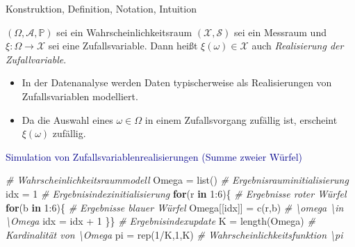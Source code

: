 \documentclass[
  8pt,
  ignorenonframetext,
]{beamer}
\newenvironment{Shaded}{\begin{snugshade}}{\end{snugshade}}
\newcommand{\CommentTok}[1]{\textcolor[rgb]{0.56,0.35,0.01}{\textit{#1}}}
\newcommand{\ControlFlowTok}[1]{\textcolor[rgb]{0.13,0.29,0.53}{\textbf{#1}}}
\newcommand{\DecValTok}[1]{\textcolor[rgb]{0.00,0.00,0.81}{#1}}
\newcommand{\FunctionTok}[1]{\textcolor[rgb]{0.00,0.00,0.00}{#1}}
\newcommand{\NormalTok}[1]{#1}
\newcommand{\OtherTok}[1]{\textcolor[rgb]{0.56,0.35,0.01}{#1}}
\newcommand{\SpecialCharTok}[1]{\textcolor[rgb]{0.00,0.00,0.00}{#1}}
\providecommand{\tightlist}{%
  \setlength{\itemsep}{0pt}\setlength{\parskip}{0pt}}
\begin{document}
\begin{frame}[fragile]{Konstruktion, Definition, Notation, Intuition}
\protect\hypertarget{konstruktion-definition-notation-intuition-6}{}
\small
\vspace{2mm}
\begin{definition}
\justifying
$(\Omega, \mathcal{A}, \mathbb{P})$ sei ein Wahrscheinlichkeitsraum
$(\mathcal{X},\mathcal{S})$ sei ein Messraum und $\xi : \Omega \to \mathcal{X}$
sei eine Zufallsvariable. Dann heißt $\xi(\omega) \in \mathcal{X}$ auch
\textit{Realisierung der Zufallvariable}.
\end{definition}
\footnotesize

\begin{itemize}
\tightlist
\item
  In der Datenanalyse werden Daten typischerweise als Realisierungen von
  Zufallsvariablen modelliert.
\item
  Da die Auswahl eines \(\omega \in \Omega\) in einem Zufallsvorgang
  zufällig ist, erscheint \(\xi(\omega)\) zufällig.
\end{itemize}

\small

\textcolor{darkblue}{Simulation von Zufallsvariablenrealisierungen (Summe zweier Würfel)}
\vspace{1mm} \footnotesize {}

\begin{Shaded}
\begin{Highlighting}[]
\CommentTok{\# Wahrscheinlichkeitsraummodell}
\NormalTok{Omega    }\OtherTok{=} \FunctionTok{list}\NormalTok{()                                 }\CommentTok{\# Ergebnisrauminitialisierung}
\NormalTok{idx      }\OtherTok{=} \DecValTok{1}                                      \CommentTok{\# Ergebnisindexinitialisierung}
\ControlFlowTok{for}\NormalTok{(r }\ControlFlowTok{in} \DecValTok{1}\SpecialCharTok{:}\DecValTok{6}\NormalTok{)\{                                    }\CommentTok{\# Ergebnisse roter  Würfel}
    \ControlFlowTok{for}\NormalTok{(b }\ControlFlowTok{in} \DecValTok{1}\SpecialCharTok{:}\DecValTok{6}\NormalTok{)\{                                }\CommentTok{\# Ergebnisse blauer Würfel}
\NormalTok{        Omega[[idx]] }\OtherTok{=} \FunctionTok{c}\NormalTok{(r,b)                     }\CommentTok{\# \textbackslash{}omega \textbackslash{}in \textbackslash{}Omega}
\NormalTok{        idx          }\OtherTok{=}\NormalTok{ idx }\SpecialCharTok{+} \DecValTok{1}\NormalTok{ \}\}                 }\CommentTok{\# Ergebnisindexupdate}
\NormalTok{K        }\OtherTok{=} \FunctionTok{length}\NormalTok{(Omega)                          }\CommentTok{\# Kardinalität von \textbackslash{}Omega}
\NormalTok{pi       }\OtherTok{=} \FunctionTok{rep}\NormalTok{(}\DecValTok{1}\SpecialCharTok{/}\NormalTok{K,}\DecValTok{1}\NormalTok{,K)                           }\CommentTok{\# Wahrscheinlichkeitsfunktion \textbackslash{}pi}


\end{Highlighting}
\end{Shaded}
\end{frame}
\end{document}

